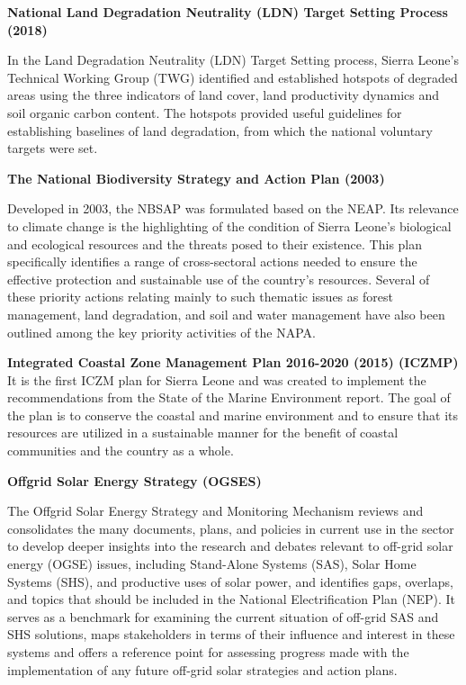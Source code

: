 \documentclass[
]{book}
\begin{document}
\textbf{National Land Degradation Neutrality (LDN) Target Setting Process (2018)}

In the Land Degradation Neutrality (LDN) Target Setting process, Sierra Leone's Technical Working Group (TWG) identified and established hotspots of degraded areas using the three indicators of land cover, land productivity dynamics and soil organic carbon content. The hotspots provided useful guidelines for establishing baselines of land degradation, from which the national voluntary targets were set.

\textbf{The National Biodiversity Strategy and Action Plan (2003)}

Developed in 2003, the NBSAP was formulated based on the NEAP. Its relevance to climate change is the highlighting of the condition of Sierra Leone's biological and ecological resources and the threats posed to their existence. This plan specifically identifies a range of cross-sectoral actions needed to ensure the effective protection and sustainable use of the country's resources. Several of these priority actions relating mainly to such thematic issues as forest management, land degradation, and soil and water management have also been outlined among the key priority activities of the NAPA.

\textbf{Integrated Coastal Zone Management Plan 2016-2020 (2015) (ICZMP)}\\
It is the first ICZM plan for Sierra Leone and was created to implement the recommendations from the State of the Marine Environment report. The goal of the plan is to conserve the coastal and marine environment and to ensure that its resources are utilized in a sustainable manner for the benefit of coastal communities and the country as a whole.

\textbf{Offgrid Solar Energy Strategy (OGSES)}

The Offgrid Solar Energy Strategy and Monitoring Mechanism reviews and consolidates the many documents, plans, and policies in current use in the sector to develop deeper insights into the research and debates relevant to off-grid solar energy (OGSE) issues, including Stand-Alone Systems (SAS), Solar Home Systems (SHS), and productive uses of solar power, and identifies gaps, overlaps, and topics that should be included in the National Electrification Plan (NEP). It serves as a benchmark for examining the current situation of off-grid SAS and SHS solutions, maps stakeholders in terms of their influence and interest in these systems and offers a reference point for assessing progress made with the implementation of any future off-grid solar strategies and action plans.
\end{document}
